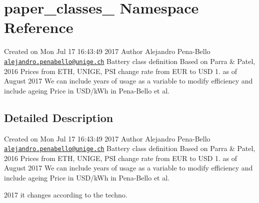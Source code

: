\hypertarget{namespacepaper__classes__2}{}\section{paper\+\_\+classes\+\_ Namespace Reference}
\label{namespacepaper__classes__2}


Created on Mon Jul 17 16\+:43\+:49 2017 Author Alejandro Pena-\/\+Bello \href{mailto:alejandro.penabello@unige.ch}{\tt alejandro.\+penabello@unige.\+ch} Battery class definition Based on Parra \& Patel, 2016 Prices from E\+TH, U\+N\+I\+GE, P\+SI change rate from E\+UR to U\+SD 1. as of August 2017 We can include years of usage as a variable to modify efficiency and include ageing Price in U\+S\+D/k\+Wh in Pena-\/\+Bello et al.  




\subsection{Detailed Description}
Created on Mon Jul 17 16\+:43\+:49 2017 Author Alejandro Pena-\/\+Bello \href{mailto:alejandro.penabello@unige.ch}{\tt alejandro.\+penabello@unige.\+ch} Battery class definition Based on Parra \& Patel, 2016 Prices from E\+TH, U\+N\+I\+GE, P\+SI change rate from E\+UR to U\+SD 1. as of August 2017 We can include years of usage as a variable to modify efficiency and include ageing Price in U\+S\+D/k\+Wh in Pena-\/\+Bello et al. 

2017 it changes according to the techno. 